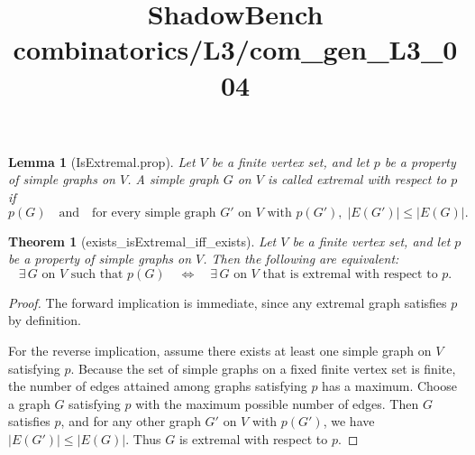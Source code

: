 \documentclass{article}
\title{ShadowBench combinatorics/L3/com\_gen\_L3\_004}
\newtheorem{theorem}{Theorem}
\newtheorem{lemma}{Lemma}
\begin{document}
\maketitle

\begin{lemma}[IsExtremal.prop]
Let \(V\) be a finite vertex set, and let \(p\) be a property of simple graphs on \(V\).
A simple graph \(G\) on \(V\) is called \emph{extremal with respect to \(p\)} if
\[
p(G)
\quad\text{and}\quad
\text{for every simple graph } G' \text{ on } V \text{ with } p(G'),
\; |E(G')| \le |E(G)|.
\]
\end{lemma}

\begin{theorem}[exists_isExtremal_iff_exists]
Let \(V\) be a finite vertex set, and let \(p\) be a property of simple graphs on \(V\).
Then the following are equivalent:
\[
\exists\, G \text{ on } V \text{ such that } p(G)
\quad\Longleftrightarrow\quad
\exists\, G \text{ on } V \text{ that is extremal with respect to } p.
\]
\end{theorem}

\begin{proof}
The forward implication is immediate, since any extremal graph satisfies \(p\) by definition.

For the reverse implication, assume there exists at least one simple graph on \(V\) satisfying \(p\).
Because the set of simple graphs on a fixed finite vertex set is finite, the number of edges
attained among graphs satisfying \(p\) has a maximum.
Choose a graph \(G\) satisfying \(p\) with the maximum possible number of edges.
Then \(G\) satisfies \(p\), and for any other graph \(G'\) on \(V\) with \(p(G')\),
we have \(|E(G')| \le |E(G)|\).
Thus \(G\) is extremal with respect to \(p\).
\end{proof}
\end{document}
